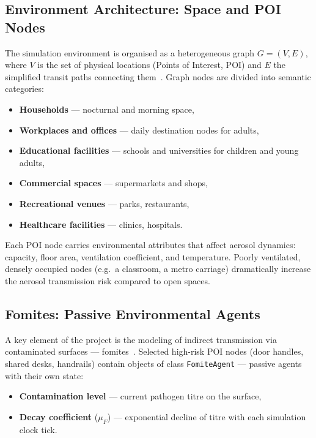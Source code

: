 \documentclass[english]{projectreport}
\begin{document}
\subsection{Environment Architecture: Space and POI Nodes}
\label{sec:environment}

The simulation environment is organised as a heterogeneous graph
$G = (V, E)$, where $V$ is the set of physical locations (Points of Interest,
POI) and $E$ the simplified transit paths connecting them~\cite{eubank2004modelling}.
Graph nodes are divided into semantic categories:

\begin{itemize}
  \item \textbf{Households} --- nocturnal and morning space,
  \item \textbf{Workplaces and offices} --- daily destination nodes for adults,
  \item \textbf{Educational facilities} --- schools and universities for
        children and young adults,
  \item \textbf{Commercial spaces} --- supermarkets and shops,
  \item \textbf{Recreational venues} --- parks, restaurants,
  \item \textbf{Healthcare facilities} --- clinics, hospitals.
\end{itemize}

Each POI node carries environmental attributes that affect aerosol dynamics:
capacity, floor area, ventilation coefficient, and temperature. Poorly
ventilated, densely occupied nodes (e.g.\ a classroom, a metro carriage)
dramatically increase the aerosol transmission risk compared to open spaces.

\subsection{Fomites: Passive Environmental Agents}
\label{sec:fomites}

A key element of the project is the modeling of indirect transmission via
contaminated surfaces --- fomites~\cite{jones2009fomites}. Selected high-risk
POI nodes (door handles, shared desks, handrails) contain objects of class
\texttt{FomiteAgent} --- passive agents with their own state:

\begin{itemize}
  \item \textbf{Contamination level} --- current pathogen titre on the surface,
  \item \textbf{Decay coefficient} ($\mu_F$) --- exponential decline of titre
        with each simulation clock tick.
\end{itemize}
\end{document}
